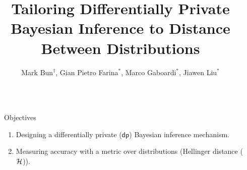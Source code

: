 \documentclass[final,hyperref={pdfpagelabels=false}]{beamer}
\title{\LARGE Tailoring Differentially Private Bayesian Inference to Distance Between Distributions} %
\author{Mark Bun$^\dag$,
Gian Pietro Farina$^{*}$,
Marco Gaboardi$^{*}$,
Jiawen Liu$^{*}$
}
\institute{$^\dag$Princeton University, $^{*}$University at Buffalo, SUNY} %
\begin{document}
\begin{frame}[t] %

\begin{columns}[t] %

\begin{column}{.015\textwidth}\end{column} %

\begin{column}{.485\textwidth} %


\begin{block}{Objectives}
\begin{enumerate}
\item Designing a differentially private ($\mathsf{dp}$) Bayesian inference mechanism.
\item Measuring accuracy with a metric over distributions (Hellinger distance ($\mathcal{H}$)).
\end{enumerate}


\end{block}
\end{column}
\end{columns}
\end{frame}
\end{document}
